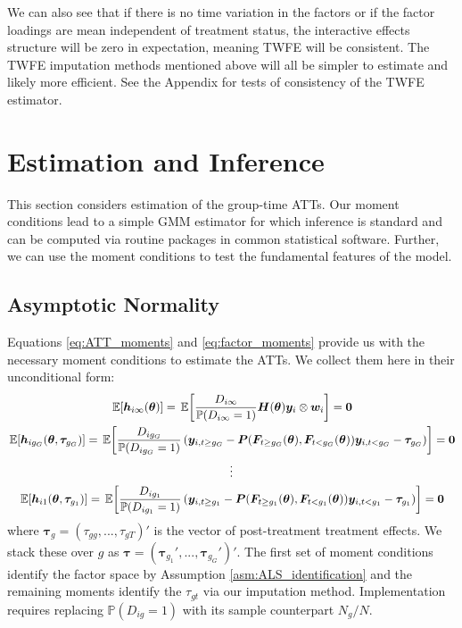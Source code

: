 \documentclass[12pt]{article}
\begin{document}
We can also see that if there is no time variation in the factors or if the factor loadings are mean independent of treatment status, the interactive effects structure will be zero in expectation, meaning TWFE will be consistent. The TWFE imputation methods mentioned above will all be simpler to estimate and likely more efficient. See the Appendix for tests of consistency of the TWFE estimator. 




\section{Estimation and Inference}\label{sec:estimation}

This section considers estimation of the group-time ATTs. Our moment conditions lead to a simple GMM estimator for which inference is standard and can be computed via routine packages in common statistical software. Further, we can use the moment conditions to test the fundamental features of the model.

\subsection{Asymptotic Normality}

Equations \eqref{eq:ATT_moments} and \eqref{eq:factor_moments} provide us with the necessary moment conditions to estimate the ATTs. We collect them here in their unconditional form: 
\begin{gather*}
  \expec{\bm h_{i\infty}(\bm \theta)} = \expec{\frac{D_{i\infty}}{\mathbb{P}(D_{i \infty} = 1)}\bm H(\bm \theta) \bm y_i \otimes \bm w_i} = \bm 0\\
  \expec{\bm h_{i g_G}(\bm{\theta}, \bm \tau_{g_G})} = \expec{ \frac{D_{ig_G}}{\mathbb{P}(D_{ig_G} = 1) } \left( \bm y_{i, t \geq g_G} - \bm P(\bm{F}_{t \geq g_G}(\bm{\theta}), \bm{F}_{t < g_G}(\bm{\theta})) \bm y_{i, t < g_G} - \bm \tau_{g_G} \right)} = \bm 0\\
  \vdots\\
  \expec{\bm h_{i 1}(\bm{\theta}, \bm \tau_{g_1})} = \expec{ \frac{D_{i g_1}}{\mathbb{P}(D_{i g_1} = 1) } \left( \bm y_{i, t \geq g_1} - \bm P(\bm{F}_{t \geq g_1}(\bm{\theta}), \bm{F}_{t < g_1}(\bm{\theta})) \bm y_{i, t < g_1} - \bm \tau_{g_1} \right)} = \bm 0
\end{gather*}
where $\bm \tau_g = (\tau_{gg},...,\tau_{gT})'$ is the vector of post-treatment treatment effects. We stack these over $g$ as $\bm \tau = (\bm \tau_{g_1}',...,\bm \tau_{g_G}')'$. The first set of moment conditions identify the factor space by Assumption \ref{asm:ALS_identification} and the remaining moments identify the $\tau_{gt}$ via our imputation method. Implementation requires replacing $\mathbb{P}(D_{ig} = 1)$ with its sample counterpart $N_g/N$. 
\end{document}
